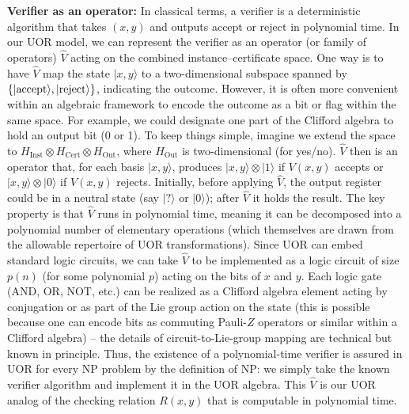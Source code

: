 \documentclass[11pt]{article}
\begin{document}
\textbf{Verifier as an operator:} In classical terms, a verifier is a deterministic algorithm that takes \((x,y)\) and outputs accept or reject in polynomial time. In our UOR model, we can represent the verifier as an operator (or family of operators) \(\hat{V}\) acting on the combined instance--certificate space. One way is to have \(\hat{V}\) map the state \(|x,y\rangle\) to a two-dimensional subspace spanned by \(\{|{\rm accept}\rangle, |{\rm reject}\rangle\}\), indicating the outcome. However, it is often more convenient within an algebraic framework to encode the outcome as a bit or flag within the same space. For example, we could designate one part of the Clifford algebra to hold an output bit (0 or 1). To keep things simple, imagine we extend the space to \(H_{\text{Inst}} \otimes H_{\text{Cert}} \otimes H_{\text{Out}}\), where \(H_{\text{Out}}\) is two-dimensional (for yes/no). \(\hat{V}\) then is an operator that, for each basis \(|x,y\rangle\), produces \(|x,y\rangle \otimes |1\rangle\) if \(V(x,y)\) accepts or \(|x,y\rangle \otimes |0\rangle\) if \(V(x,y)\) rejects. Initially, before applying \(\hat{V}\), the output register could be in a neutral state (say \(|?\rangle\) or \(|0\rangle\)); after \(\hat{V}\) it holds the result. The key property is that \(\hat{V}\) runs in polynomial time, meaning it can be decomposed into a polynomial number of elementary operations (which themselves are drawn from the allowable repertoire of UOR transformations). Since UOR can embed standard logic circuits, we can take \(\hat{V}\) to be implemented as a logic circuit of size \(p(n)\) (for some polynomial \(p\)) acting on the bits of \(x\) and \(y\). Each logic gate (AND, OR, NOT, etc.) can be realized as a Clifford algebra element acting by conjugation or as part of the Lie group action on the state (this is possible because one can encode bits as commuting Pauli-\(Z\) operators or similar within a Clifford algebra) -- the details of circuit-to-Lie-group mapping are technical but known in principle. Thus, the existence of a polynomial-time verifier is assured in UOR for every NP problem by the definition of NP: we simply take the known verifier algorithm and implement it in the UOR algebra. This \(\hat{V}\) is our UOR analog of the checking relation \(R(x,y)\) that is computable in polynomial time.
\end{document}
